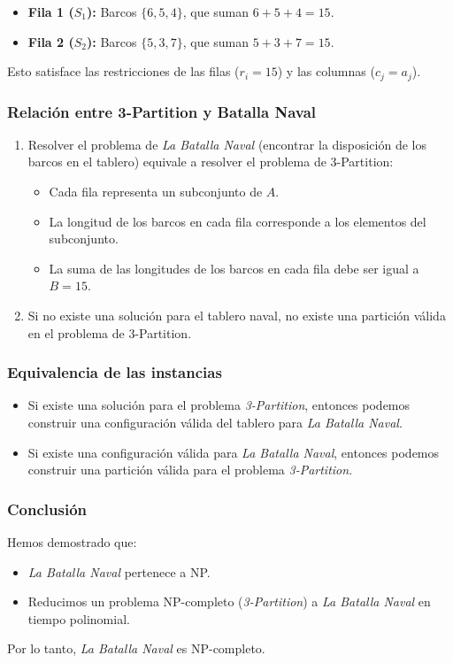 \begin{itemize}
    \item \textbf{Fila 1 ($S_1$):} Barcos $\{6, 5, 4\}$, que suman $6 + 5 + 4 = 15$.
    \item \textbf{Fila 2 ($S_2$):} Barcos $\{5, 3, 7\}$, que suman $5 + 3 + 7 = 15$.
\end{itemize}

Esto satisface las restricciones de las filas ($r_i = 15$) y las columnas ($c_j = a_j$).

\subsubsection*{Relación entre 3-Partition y Batalla Naval}

\begin{enumerate}
    \item Resolver el problema de \textit{La Batalla Naval} (encontrar la disposición de los barcos en el tablero) equivale a resolver el problema de 3-Partition:
    \begin{itemize}
        \item Cada fila representa un subconjunto de $A$.
        \item La longitud de los barcos en cada fila corresponde a los elementos del subconjunto.
        \item La suma de las longitudes de los barcos en cada fila debe ser igual a $B = 15$.
    \end{itemize}

    \item Si no existe una solución para el tablero naval, no existe una partición válida en el problema de 3-Partition.
\end{enumerate}


\subsubsection*{Equivalencia de las instancias}

\begin{itemize}
    \item Si existe una solución para el problema \textit{3-Partition}, entonces podemos construir una configuración válida del tablero para \textit{La Batalla Naval}.
    \item Si existe una configuración válida para \textit{La Batalla Naval}, entonces podemos construir una partición válida para el problema \textit{3-Partition}.
\end{itemize}

\subsubsection*{Conclusión}

Hemos demostrado que:
\begin{itemize}
    \item \textit{La Batalla Naval} pertenece a NP.
    \item Reducimos un problema NP-completo (\textit{3-Partition}) a \textit{La Batalla Naval} en tiempo polinomial.
\end{itemize}

Por lo tanto, \textit{La Batalla Naval} es NP-completo.
